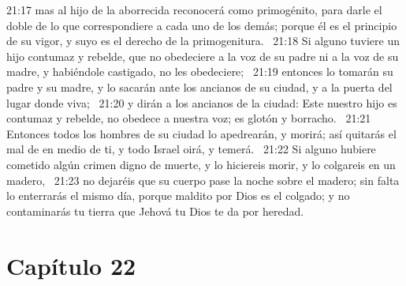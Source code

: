 21:17 mas al hijo de la aborrecida reconocerá como primogénito, para darle el doble de lo que correspondiere a cada uno de los demás; porque él es el principio de su vigor, y suyo es el derecho de la primogenitura.  
21:18 Si alguno tuviere un hijo contumaz y rebelde, que no obedeciere a la voz de su padre ni a la voz de su madre, y habiéndole castigado, no les obedeciere;  
21:19 entonces lo tomarán su padre y su madre, y lo sacarán ante los ancianos de su ciudad, y a la puerta del lugar donde viva;  
21:20 y dirán a los ancianos de la ciudad: Este nuestro hijo es contumaz y rebelde, no obedece a nuestra voz; es glotón y borracho.  
21:21 Entonces todos los hombres de su ciudad lo apedrearán, y morirá; así quitarás el mal de en medio de ti, y todo Israel oirá, y temerá.  
21:22 Si alguno hubiere cometido algún crimen digno de muerte, y lo hiciereis morir, y lo colgareis en un madero,  
21:23 no dejaréis que su cuerpo pase la noche sobre el madero; sin falta lo enterrarás el mismo día, porque maldito por Dios es el colgado; y no contaminarás tu tierra que Jehová tu Dios te da por heredad.  
\section*{Capítulo 22 }

